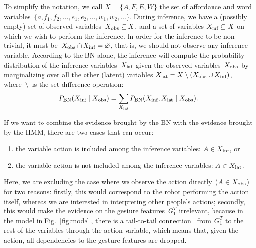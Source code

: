 To simplify the notation, we call $X = \{A, F, E, W\}$ the set of affordance and word variables~$\{a, f_1, f_2, \dots, e_1, e_2, \dots, w_1, w_2, \dots\}$.
During inference, we have a (possibly empty) set of observed variables~$X_\text{obs} \subseteq X$, and a set of variables $X_\text{inf} \subseteq X$ on which we wish to perform the inference.
In order for the inference to be non-trivial, it must be~$X_\text{obs} \cap X_\text{inf} = \varnothing$, that is, we should not observe any inference variable.
According to the \ac{BN} alone, the inference will compute the probability distribution of the inference variables~$X_\text{inf}$ given the observed variables~$X_\text{obs}$ by marginalizing over all the other (latent) variables $X_\text{lat} = X \setminus (X_\text{obs} \cup X_\text{inf})$, where~$\setminus$~is the set difference operation:
\begin{equation*}
 P_{\text{BN}}(X_\text{inf} \mid X_\text{obs}) = \sum_{X_\text{lat}} P_{\text{BN}}(X_\text{inf}, X_\text{lat} \mid X_\text{obs}).
\end{equation*}

If we want to combine the evidence brought by the \ac{BN} with the evidence brought by the \ac{HMM}, there are two cases that can occur:
\begin{enumerate}
\item the variable action is included among the inference variables: $A \in X_\text{inf}$, or

\item the variable action is not included among the inference variables: $A \in X_\text{lat}$.
\end{enumerate}

Here, we are excluding the case where we observe the action directly~($A \in X_\text{obs}$) for two reasons: firstly, this would correspond to the robot performing the action itself, whereas we are interested in interpreting other people's actions;
secondly, this would make the evidence on the gesture features~$G_1^T$ irrelevant, because in the model in Fig.~\ref{fig:model}, there is a tail-to-tail connection~\cite{pearl:2014:probabilistic} from~$G_1^T$ to the rest of the variables through the action variable, which means that, given the action, all dependencies to the gesture features are dropped.

